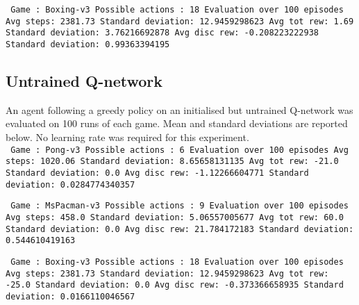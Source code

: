 \documentclass[paper=a4, fontsize=11pt]{scrartcl} %
\numberwithin{equation}{section} %
\numberwithin{figure}{section} %
\numberwithin{table}{section} %
\begin{document}
\texttt{
Game : Boxing-v3 \newline
Possible actions : 18 \newline
Evaluation over 100 episodes \newline
Avg steps: 2381.73 \quad\quad\quad\quad\quad\quad\quad\quad\quad Standard deviation: 12.9459298623 \newline
Avg tot rew: 1.69 \quad\quad\quad\quad\quad\quad\quad\quad\quad  Standard deviation: 3.76216692878 \newline
Avg disc rew: -0.208223222938 \quad\quad\quad  Standard deviation: 0.99363394195 \newline
}


\subsection{Untrained Q-network}
An agent following a greedy policy on an initialised but untrained Q-network was evaluated on 100 runs of each game. Mean and standard deviations are reported below. No learning rate was required for this experiment.\\

\texttt{
Game : Pong-v3 \newline
Possible actions : 6 \newline
Evaluation over 100 episodes \newline
Avg steps: 1020.06 \quad\quad\quad\quad\quad\quad\quad\quad Standard deviation: 8.65658131135 \newline
Avg tot rew: -21.0 \quad\quad\quad\quad\quad\quad\quad\quad Standard deviation: 0.0 \newline
Avg disc rew: -1.12266604771 \quad\quad\quad Standard deviation: 0.0284774340357 \newline
}

\texttt{
Game : MsPacman-v3 \newline
Possible actions : 9 \newline
Evaluation over 100 episodes \newline
Avg steps: 458.0 \quad\quad\quad\quad\quad\quad\quad\quad\quad Standard deviation: 5.06557005677 \newline
Avg tot rew: 60.0 \quad\quad\quad\quad\quad\quad\quad\quad\quad Standard deviation: 0.0 \newline
Avg disc rew: 21.784172183 \quad\quad\quad\quad Standard deviation: 0.544610419163 \newline
}

\texttt{
Game : Boxing-v3 \newline
Possible actions : 18 \newline
Evaluation over 100 episodes \newline
Avg steps: 2381.73 \quad\quad\quad\quad\quad\quad\quad\quad Standard deviation: 12.9459298623 \newline
Avg tot rew: -25.0 \quad\quad\quad\quad\quad\quad\quad\quad Standard deviation: 0.0 \newline
Avg disc rew: -0.373366658935 \quad\quad\quad Standard deviation: 0.0166110046567 \newline
}
\end{document}
